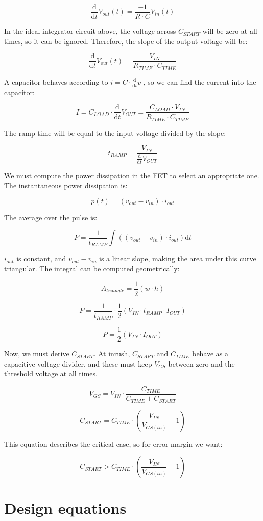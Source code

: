 \documentclass[letterpaper,12pt]{article}
\newcommand{\ddt}{\ensuremath{\frac{\mathrm{d}}{\mathrm{d}t}}}
\newcommand{\dt}{\ensuremath{{\mathrm{d}t}}}
\begin{document}
$$ \ddt V_{out}(t) = \frac{-1}{R\cdot C} V_{in}(t) $$

In the ideal integrator circuit above, the voltage across $C_{START}$ will be zero at
all times, so it can be ignored. Therefore, the slope of the output voltage will be:

$$ \ddt V_{out}(t) = \frac{V_{IN}}{R_{TIME}\cdot C_{TIME}} $$

A capacitor behaves according to $i = C \cdot \ddt v$ \cite[p. 19]{aoe}, so we can find the
current into the capacitor:

$$ I = C_{LOAD} \cdot \ddt V_{OUT} = \frac{C_{LOAD}\cdot V_{IN}}{R_{TIME}\cdot C_{TIME}} $$

The ramp time will be equal to the input voltage divided by the slope:

$$ t_{RAMP} = \frac{V_{IN}}{\ddt V_{OUT}} $$

We must compute the power dissipation in the FET to select an appropriate one. The instantaneous
power dissipation is:

$$ p(t) = (v_{out} - v_{in})\cdot i_{out} $$

The average over the pulse is:

$$ P = \frac{1}{t_{RAMP}} \int \left( (v_{out} - v_{in}) \cdot i_{out} \right) \dt $$

$i_{out}$ is constant, and $v_{out} - v_{in}$ is a linear slope, making the area under this curve
triangular. The integral can be computed geometrically:

$$ A_{triangle} = \frac{1}{2} (w \cdot h) $$

$$ P = \frac{1}{t_{RAMP}} \cdot \frac{1}{2} \left( V_{IN} \cdot t_{RAMP} \cdot I_{OUT} \right) $$

$$ P = \frac{1}{2} \left( V_{IN} \cdot I_{OUT} \right) $$

Now, we must derive $C_{START}$. At inrush, $C_{START}$ and $C_{TIME}$ behave as a capacitive
voltage divider, and these must keep $V_{GS}$ between zero and the threshold voltage at all
times.

$$ V_{GS} = V_{IN} \cdot \frac{C_{TIME}}{C_{TIME} + C_{START}} $$

$$ C_{START} = C_{TIME} \cdot \left( \frac{V_{IN}}{V_{GS(th)}} - 1 \right) $$

This equation describes the critical case, so for error margin we want:

$$ C_{START} > C_{TIME} \cdot \left( \frac{V_{IN}}{V_{GS(th)}} - 1 \right) $$

\section{Design equations}
\label{sec:equations}
\end{document}
